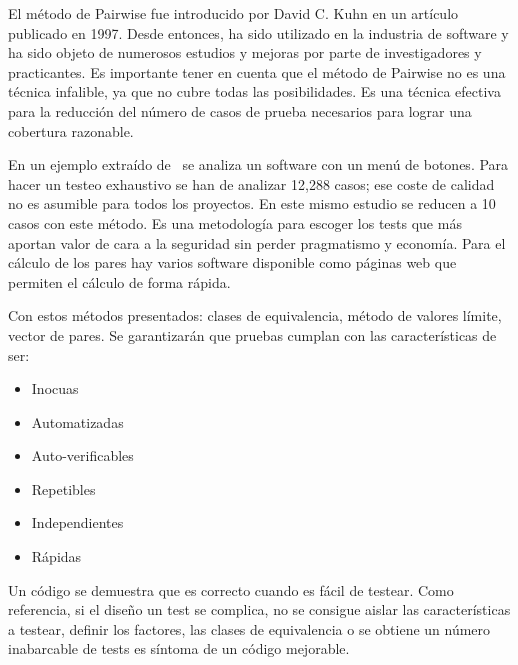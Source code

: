 El método de Pairwise fue introducido por David C. Kuhn en un artículo~\cite{37051} publicado en 1997.
Desde entonces, ha sido utilizado en la industria de software y ha sido objeto de numerosos estudios y mejoras por parte de investigadores y practicantes.
Es importante tener en cuenta que el método de Pairwise no es una técnica infalible, ya que no cubre todas las posibilidades.
Es una técnica efectiva para la reducción del número de casos de prueba necesarios para lograr una cobertura razonable.

En un ejemplo extraído de~\cite{Bach04pairwisetesting} se analiza un software con un menú de botones.
Para hacer un testeo exhaustivo se han de analizar 12,288 casos;
ese coste de calidad no es asumible para todos los proyectos.
En este mismo estudio se reducen a 10 casos con este método.
Es una metodología para escoger los tests que más aportan valor de cara a la seguridad sin perder pragmatismo y economía.
Para el cálculo de los pares hay varios software disponible como páginas web que permiten el cálculo de forma rápida.

Con estos métodos presentados: clases de equivalencia, método de valores límite, vector de pares.
Se garantizarán que pruebas cumplan con las características de ser:

\begin{itemize}
    \item Inocuas
    \item Automatizadas
    \item Auto-verificables
    \item Repetibles
    \item Independientes
    \item Rápidas
\end{itemize}

Un código se demuestra que es correcto cuando es fácil de testear.
Como referencia, si el diseño un test se complica, no se consigue aislar las características a testear, definir los factores, las clases de equivalencia o se obtiene un número inabarcable de tests es síntoma de un código mejorable.
